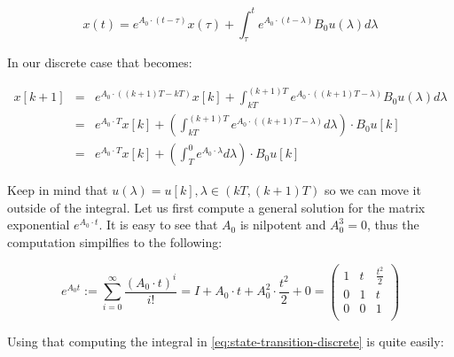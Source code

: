 \documentclass[english,ngerman]{KITreprt}
\begin{document}
\begin{equation}
x(t) = e^{A_0 \cdot (t - \tau)} x(\tau) + \int^t_\tau e^{A_0 \cdot (t - \lambda)} B_0 u(\lambda) d\lambda
\end{equation}

In our discrete case that becomes:

\begin{eqnarray} \label{eq:state-transition-discrete}
x[k+1] & = & e^{A_0 \cdot ((k+1)T - kT)} x[k] + \int^{(k+1)T}_{kT} e^{A_0 \cdot ((k+1)T - \lambda)} B_0 u(\lambda) d\lambda \\
       & = & e^{A_0 \cdot T} x[k] + \left(\int^{(k+1)T}_{kT} e^{A_0 \cdot ((k+1)T - \lambda)} d\lambda \right) \cdot B_0 u[k]\\
       & = & e^{A_0 \cdot T} x[k] + \left(\int^{0}_{T} e^{A_0 \cdot \lambda} d\lambda\right) \cdot B_0 u[k]
\end{eqnarray}

Keep in mind that $u(\lambda) = u[k], \lambda \in (kT, (k+1)T)$ so we
can move it outside of the integral. Let us first compute a general
solution for the matrix exponential $e^{A_0 \cdot t}$. It is easy to see
that $A_0$ is nilpotent and $A_0^3 = 0$, thus the computation simpilfies
to the following:

\begin{equation}
e^{A_0 t} := \sum^{\infty}_{i=0} \frac{(A_0 \cdot t)^i}{i!} = I + A_0 \cdot t + A_0^2 \cdot \frac{t^2}{2} + 0
=
\left(\begin{array}{ccc}
1 & t & \frac{t^2}{2}\\
0 & 1 & t \\
0 & 0 & 1 \\
\end{array}\right)
\end{equation}

Using that computing the integral in \ref{eq:state-transition-discrete}
is quite easily:
\end{document}
